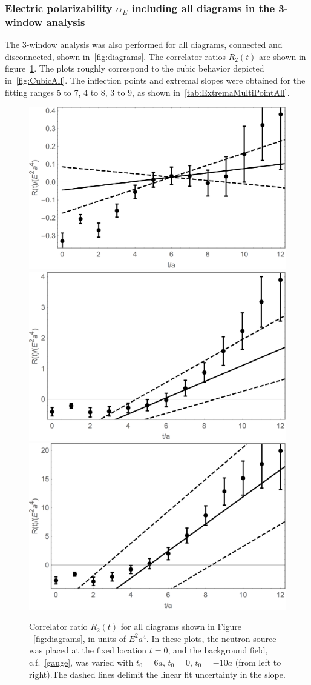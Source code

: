 
\subsubsection{Electric polarizability $\alpha_E$ including all diagrams in the 3-window analysis}
\label{3573wAll}
The 3-window analysis was also performed for all diagrams, connected and disconnected,
shown in~\ref{fig:diagrams}. The correlator ratios $R_2(t)$ are shown in figure~\ref{fig:Correlators3wAll}. 
The plots roughly correspond to the cubic behavior depicted in~\ref{fig:CubicAll}.
 The inflection points and extremal slopes were obtained for 
 the fitting ranges 5 to 7, 4 to 8, 3 to 9, as shown in~\ref{tab:ExtremaMultiPointAll}.
\begin{figure}[H]
\centering
\includegraphics[width=.333\linewidth]{figures/FullshshLineCS.png}
\includegraphics[width=.32\linewidth]{figures/Fullfrom0LineCS.png}
\includegraphics[width=.325\linewidth]{figures/FullshortLineCS.png}\\
\caption{Correlator ratio $R_2(t)$ for all diagrams shown in Figure ~\ref{fig:diagrams}, in units of $E^2a^4$. In these plots, the neutron source was placed at the fixed location $t=0$, and the background field, c.f.~\ref{gauge}, was varied with $t_0=6a$, $t_0=0$, $t_0=-10a$ (from left to right).The dashed lines delimit the linear fit uncertainty in the slope.}
\label{fig:Correlators3wAll}
\end{figure}
